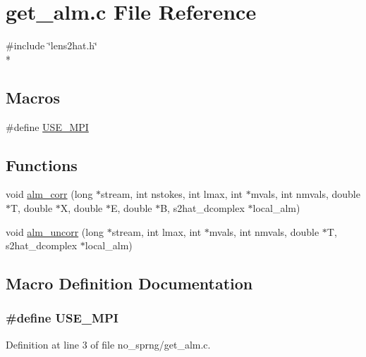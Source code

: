\section{get\-\_\-alm.\-c File Reference}
\label{no__sprng_2get__alm_8c}
{\ttfamily \#include \char`\"{}lens2hat.\-h\char`\"{}}\\*
\subsection*{Macros}
\begin{DoxyCompactItemize}
\item 
\#define \hyperlink{no__sprng_2get__alm_8c_a3869d282031f6ea6b50fdb980b758420}{U\-S\-E\-\_\-\-M\-P\-I}
\end{DoxyCompactItemize}
\subsection*{Functions}
\begin{DoxyCompactItemize}
\item 
void \hyperlink{no__sprng_2get__alm_8c_af7e9f4ce20a8335da38808a05d0f63ae}{alm\-\_\-corr} (long $\ast$stream, int nstokes, int lmax, int $\ast$mvals, int nmvals, double $\ast$T, double $\ast$X, double $\ast$E, double $\ast$B, s2hat\-\_\-dcomplex $\ast$local\-\_\-alm)
\item 
void \hyperlink{no__sprng_2get__alm_8c_aa0789dcb4acd432d85d5c4882713444f}{alm\-\_\-uncorr} (long $\ast$stream, int lmax, int $\ast$mvals, int nmvals, double $\ast$T, s2hat\-\_\-dcomplex $\ast$local\-\_\-alm)
\end{DoxyCompactItemize}


\subsection{Macro Definition Documentation}
\subsubsection[{U\-S\-E\-\_\-\-M\-P\-I}]{\setlength{\rightskip}{0pt plus 5cm}\#define U\-S\-E\-\_\-\-M\-P\-I}\label{no__sprng_2get__alm_8c_a3869d282031f6ea6b50fdb980b758420}


Definition at line 3 of file no\-\_\-sprng/get\-\_\-alm.\-c.



